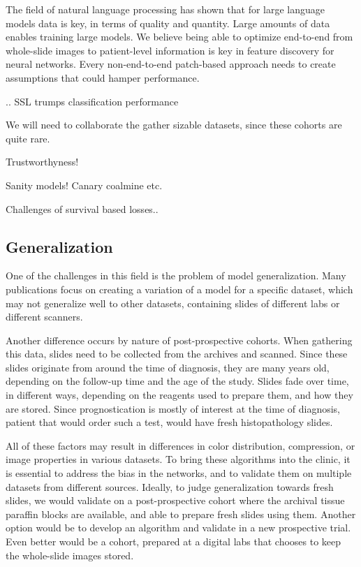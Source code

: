 \documentclass[
  12pt,
  a5,margin=2cmpaper,
]{article}
\begin{document}
The field of natural language processing has shown that for large
language models data is key, in terms of quality and quantity. Large
amounts of data enables training large models. We believe being able to
optimize end-to-end from whole-slide images to patient-level information
is key in feature discovery for neural networks. Every non-end-to-end
patch-based approach needs to create assumptions that could hamper
performance.

.. SSL trumps classification performance

We will need to collaborate the gather sizable datasets, since these
cohorts are quite rare.

Trustworthyness!

Sanity models! Canary coalmine etc.

Challenges of survival based losses..

\hypertarget{generalization}{%
\subsection{Generalization}\label{generalization}}

One of the challenges in this field is the problem of model
generalization. Many publications focus on creating a variation of a
model for a specific dataset, which may not generalize well to other
datasets, containing slides of different labs or different scanners.

Another difference occurs by nature of post-prospective cohorts. When
gathering this data, slides need to be collected from the archives and
scanned. Since these slides originate from around the time of diagnosis,
they are many years old, depending on the follow-up time and the age of
the study. Slides fade over time, in different ways, depending on the
reagents used to prepare them, and how they are stored. Since
prognostication is mostly of interest at the time of diagnosis, patient
that would order such a test, would have fresh histopathology slides.

All of these factors may result in differences in color distribution,
compression, or image properties in various datasets. To bring these
algorithms into the clinic, it is essential to address the bias in the
networks, and to validate them on multiple datasets from different
sources. Ideally, to judge generalization towards fresh slides, we would
validate on a post-prospective cohort where the archival tissue paraffin
blocks are available, and able to prepare fresh slides using them.
Another option would be to develop an algorithm and validate in a new
prospective trial. Even better would be a cohort, prepared at a digital
labs that chooses to keep the whole-slide images stored.
\end{document}
